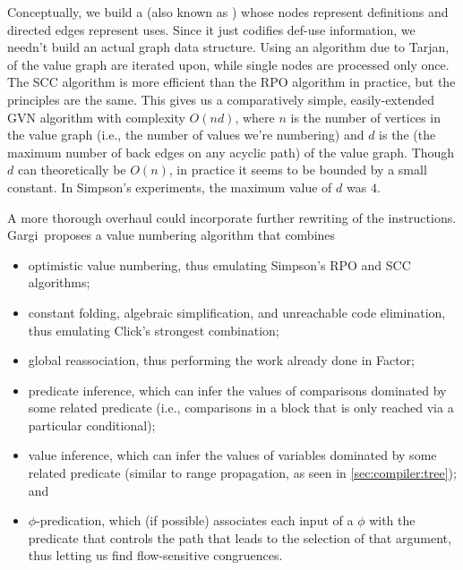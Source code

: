 Conceptually, we build a  (also known as ) whose nodes represent definitions and directed edges
represent uses.  Since it just codifies def-use information, we needn't build
an actual graph data structure.  Using an algorithm due to
Tarjan,  of the value graph are iterated upon,
while single nodes are processed only once.  The \gls{SCC} algorithm is more
efficient than the \gls{RPO} algorithm in practice, but the principles are the
same.  This gives us a comparatively simple, easily-extended \gls{GVN}
algorithm with complexity $O(nd)$, where $n$ is the number of vertices in the
value graph (i.e., the number of values we're numbering) and $d$ is the
 (the maximum number of back edges on any acyclic
path) of the value graph.  Though $d$ can theoretically be $O(n)$, in practice
it seems to be bounded by a small constant.  In Simpson's
experiments, the maximum value of $d$ was $4$.

A more thorough overhaul could incorporate further rewriting of the
instructions.  Gargi~proposes a  value
numbering algorithm that combines
\begin{itemize}
  \item optimistic value numbering, thus emulating Simpson's
        \gls{RPO} and \gls{SCC} algorithms; 
  \item constant folding, algebraic simplification, and unreachable code
        elimination, thus emulating Click's strongest combination;
  \item global reassociation, thus performing the work already done in Factor;
  \item predicate inference, which can infer the values of comparisons
        dominated by some related predicate (i.e., comparisons in a block that
        is only reached via a particular conditional);
  \item value inference, which can infer the values of variables dominated by
        some related predicate (similar to range propagation, as seen in
        \cref{sec:compiler:tree}); and
  \item $\phi$-predication, which (if possible) associates each input of a
        $\phi$ with the predicate that controls the path that leads to the
        selection of that argument, thus letting us find flow-sensitive
        congruences.
\end{itemize}

